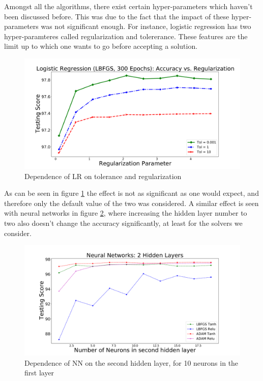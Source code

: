Amongst all the algorithms, there exist certain hyper-parameters which haven't been discussed before. This was due to the fact that the impact of these hyper-parameters was not significant enough. For instance, logistic regression has two hyper-paramteres called regularization and tolererance. These features are the limit up to which one wants to go before accepting a solution. 
\begin{figure}[h]
\includegraphics[width=\twopicsp\textwidth]{plots/lr_train_reg.pdf}
\caption{Dependence of LR on tolerance and regularization}
\label{fig:Lr_tol_reg}
\end{figure}
As can be seen in figure \ref{fig:Lr_tol_reg} the effect is not as significant as one would expect, and therefore only the default value of the two was considered. A similar effect is seen with neural networks in figure \ref{fig:nn_nn}, where increasing the hidden layer number to two also doesn't change the accuracy significantly, at least for the solvers we consider.
\begin{figure}[h]
\includegraphics[width=\twopicsp\textwidth]{plots/nn_2layers_3fgl.pdf}
\caption{Dependence of NN on the second hidden layer, for 10 neurons in the first layer}
\label{fig:nn_nn}
\end{figure}

